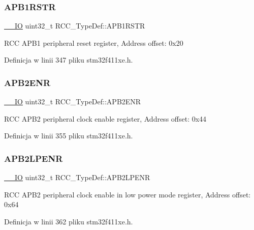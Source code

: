 \subsubsection{\texorpdfstring{A\+P\+B1\+R\+S\+TR}{APB1RSTR}}
{\footnotesize\ttfamily \hyperlink{core__sc300_8h_aec43007d9998a0a0e01faede4133d6be}{\+\_\+\+\_\+\+IO} uint32\+\_\+t R\+C\+C\+\_\+\+Type\+Def\+::\+A\+P\+B1\+R\+S\+TR}

R\+CC A\+P\+B1 peripheral reset register, Address offset\+: 0x20 

Definicja w linii 347 pliku stm32f411xe.\+h.

\mbox{\label{struct_r_c_c___type_def_a619b4c22f630a269dfd0c331f90f6868}} 
\subsubsection{\texorpdfstring{A\+P\+B2\+E\+NR}{APB2ENR}}
{\footnotesize\ttfamily \hyperlink{core__sc300_8h_aec43007d9998a0a0e01faede4133d6be}{\+\_\+\+\_\+\+IO} uint32\+\_\+t R\+C\+C\+\_\+\+Type\+Def\+::\+A\+P\+B2\+E\+NR}

R\+CC A\+P\+B2 peripheral clock enable register, Address offset\+: 0x44 

Definicja w linii 355 pliku stm32f411xe.\+h.

\mbox{\label{struct_r_c_c___type_def_a7e46c65220f00a6858a5b35b74a37b51}} 
\subsubsection{\texorpdfstring{A\+P\+B2\+L\+P\+E\+NR}{APB2LPENR}}
{\footnotesize\ttfamily \hyperlink{core__sc300_8h_aec43007d9998a0a0e01faede4133d6be}{\+\_\+\+\_\+\+IO} uint32\+\_\+t R\+C\+C\+\_\+\+Type\+Def\+::\+A\+P\+B2\+L\+P\+E\+NR}

R\+CC A\+P\+B2 peripheral clock enable in low power mode register, Address offset\+: 0x64 

Definicja w linii 362 pliku stm32f411xe.\+h.

\mbox{\label{struct_r_c_c___type_def_a4491ab20a44b70bf7abd247791676a59}} 
